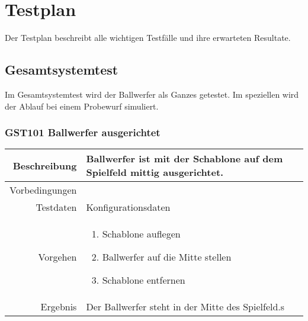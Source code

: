 \section{Testplan}
\label{sec:testplan}

Der Testplan beschreibt alle wichtigen Testfälle und ihre erwarteten Resultate.

\subsection{Gesamtsystemtest}

Im Gesamtsystemtest wird der Ballwerfer als Ganzes getestet. Im speziellen wird der Ablauf bei einem Probewurf simuliert.

\subsubsection{GST101 Ballwerfer ausgerichtet}
\begin{table}[h!]
	\renewcommand{\arraystretch}{1.5}
	\begin{tabular}{|r|p{13cm}|}
		\hline Beschreibung & Ballwerfer ist mit der Schablone auf dem Spielfeld mittig ausgerichtet. \\ 
		\hline Vorbedingungen &  \\ 
		\hline Testdaten & Konfigurationsdaten \\ 
		\hline Vorgehen & 
		\begin{enumerate}
			\item Schablone auflegen
			\item Ballwerfer auf die Mitte stellen
			\item Schablone entfernen
		\end{enumerate} \\ 
		\hline Ergebnis & Der Ballwerfer steht in der Mitte des Spielfeld.s \\ 
		\hline 
	\end{tabular}
\end{table}

